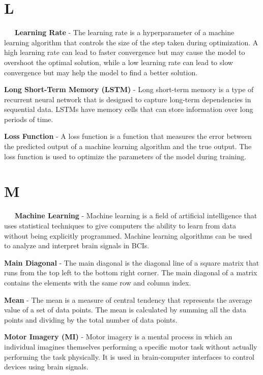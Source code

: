 \section*{L}

\-\ \-\ \-\ \textbf{Learning Rate} - The learning rate is a hyperparameter of a machine learning algorithm that controls the size of the step taken during optimization. A high learning rate can lead to faster convergence but may cause the model to overshoot the optimal solution, while a low learning rate can lead to slow convergence but may help the model to find a better solution.

\textbf{Long Short-Term Memory (LSTM)} - Long short-term memory is a type of recurrent neural network that is designed to capture long-term dependencies in sequential data. LSTMs have memory cells that can store information over long periods of time.

\textbf{Loss Function} - A loss function is a function that measures the error between the predicted output of a machine learning algorithm and the true output. The loss function is used to optimize the parameters of the model during training.

\section*{M}

\-\ \-\ \-\ \textbf{Machine Learning} - Machine learning is a field of artificial intelligence that uses statistical techniques to give computers the ability to learn from data without being explicitly programmed. Machine learning algorithms can be used to analyze and interpret brain signals in BCIs.

\textbf{Main Diagonal} - The main diagonal is the diagonal line of a square matrix that runs from the top left to the bottom right corner. The main diagonal of a matrix contains the elements with the same row and column index.

\textbf{Mean} - The mean is a measure of central tendency that represents the average value of a set of data points. The mean is calculated by summing all the data points and dividing by the total number of data points.

\textbf{Motor Imagery (MI)} - Motor imagery is a mental process in which an individual imagines themselves performing a specific motor task without actually performing the task physically. It is used in brain-computer interfaces to control devices using brain signals.

